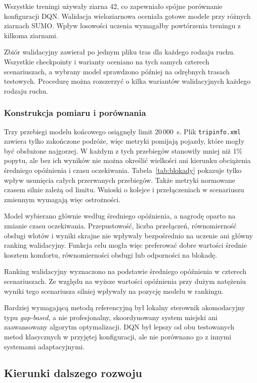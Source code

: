 Wszystkie treningi używały ziarna 42, co zapewniało spójne porównanie konfiguracji DQN. Walidacja wieloziarnowa oceniała gotowe modele przy różnych ziarnach SUMO. Wpływ losowości uczenia wymagałby powtórzenia treningu z kilkoma ziarnami.

Zbiór walidacyjny zawierał po jednym pliku tras dla każdego rodzaju ruchu. Wszystkie checkpointy i warianty oceniano na tych samych czterech scenariuszach, a wybrany model sprawdzono później na odrębnych trasach testowych. Procedurę można rozszerzyć o kilka wariantów walidacyjnych każdego rodzaju ruchu.

\subsubsection{Konstrukcja pomiaru i porównania}

Trzy przebiegi modelu końcowego osiągnęły limit 20\,000~s. Plik \texttt{tripinfo.xml} zawiera tylko zakończone podróże, więc metryki pomijają pojazdy, które mogły być obsłużone najgorzej. W każdym z tych przebiegów stanowiły mniej niż 1\% popytu, ale bez ich wyników nie można określić wielkości ani kierunku obciążenia średniego opóźnienia i czasu oczekiwania. Tabela~\ref{tab:blokady} pokazuje tylko wpływ usunięcia całych przerwanych przebiegów. Także metryki normowane czasem silnie zależą od limitu. Wnioski o kolejce i przełączeniach w scenariuszu zmiennym wymagają więc ostrożności.

Model wybierano głównie według średniego opóźnienia, a nagrodę oparto na zmianie czasu oczekiwania. Przepustowość, liczba przełączeń, równomierność obsługi wlotów i wyniki skrajne nie wpływały bezpośrednio na uczenie ani główny ranking walidacyjny. Funkcja celu mogła więc preferować dobre wartości średnie kosztem komfortu, równomierności obsługi lub odporności na blokadę.

Ranking walidacyjny wyznaczono na podstawie średniego opóźnienia w czterech scenariuszach. Ze względu na wyższe wartości opóźnienia przy dużym natężeniu wyniki tego scenariusza silniej wpływały na pozycję modelu w rankingu.

Bardziej wymagającą metodą referencyjną był lokalny sterownik akomodacyjny typu \textit{gap-based}, a nie profesjonalny, skoordynowany system miejski ani zaawansowany algorytm optymalizacji. DQN był lepszy od obu testowanych metod klasycznych w przyjętej konfiguracji, ale nie porównano go z innymi systemami adaptacyjnymi.

\subsection{Kierunki dalszego rozwoju}
\label{subsec:kierunki-rozwoju}

